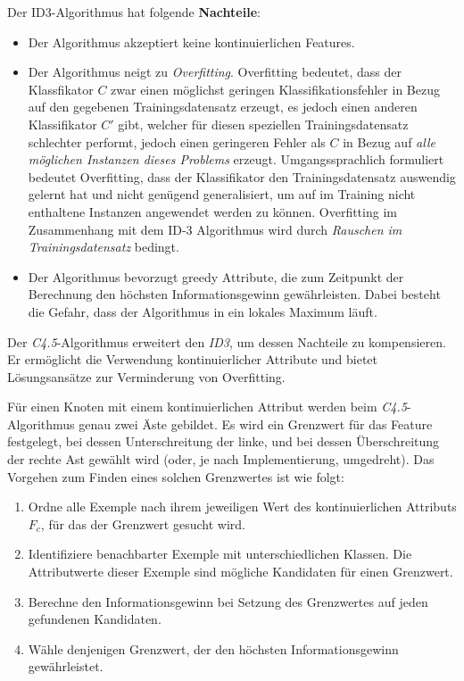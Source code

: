 Der ID3-Algorithmus hat folgende \textbf{Nachteile}:
\begin{itemize}
\item Der Algorithmus akzeptiert keine kontinuierlichen Features.\cite[S. 72]{machine_mitchell}
\item Der Algorithmus neigt zu \emph{Overfitting}. Overfitting bedeutet, dass der Klassfikator $C$ zwar einen möglichst geringen Klassifikationsfehler in Bezug auf den gegebenen Trainingsdatensatz erzeugt, es jedoch einen anderen Klassifikator $C'$ gibt, welcher für diesen speziellen Trainingsdatensatz schlechter performt, jedoch einen geringeren Fehler als $C$ in Bezug auf \emph{alle möglichen Instanzen dieses Problems} erzeugt. Umgangssprachlich formuliert bedeutet Overfitting, dass der Klassifikator den Trainingsdatensatz \glqq auswendig gelernt hat\grqq{} und nicht genügend generalisiert, um auf im Training nicht enthaltene Instanzen angewendet werden zu können. Overfitting im Zusammenhang mit dem ID-3 Algorithmus wird durch \emph{Rauschen im Trainingsdatensatz} bedingt.
\item Der Algorithmus bevorzugt greedy Attribute, die zum Zeitpunkt der Berechnung den höchsten Informationsgewinn gewährleisten. Dabei besteht die Gefahr, dass der Algorithmus in ein lokales Maximum läuft.\cite[S. 66 - 70]{machine_mitchell}
\end{itemize}

Der \emph{C4.5}-Algorithmus erweitert den \emph{ID3}, um dessen Nachteile zu kompensieren. Er ermöglicht die Verwendung kontinuierlicher Attribute und bietet Lösungsansätze zur Verminderung von Overfitting.

Für einen Knoten mit einem kontinuierlichen Attribut werden beim \emph{C4.5}-Algorithmus genau zwei Äste gebildet. Es wird ein Grenzwert für das Feature festgelegt, bei dessen Unterschreitung der linke, und bei dessen Überschreitung der rechte Ast gewählt wird (oder, je nach Implementierung, umgedreht). Das Vorgehen zum Finden eines solchen Grenzwertes ist wie folgt:

\begin{enumerate}
\item Ordne alle Exemple nach ihrem jeweiligen Wert des kontinuierlichen Attributs $F_c$, für das der Grenzwert gesucht wird. 
\item Identifiziere benachbarter Exemple mit unterschiedlichen Klassen. Die Attributwerte dieser Exemple sind mögliche Kandidaten für einen Grenzwert.
\item Berechne den Informationsgewinn bei Setzung des Grenzwertes auf jeden gefundenen Kandidaten. 
\item Wähle denjenigen Grenzwert, der den höchsten Informationsgewinn gewährleistet.\cite[S. 73]{machine_mitchell}
\end{enumerate}

